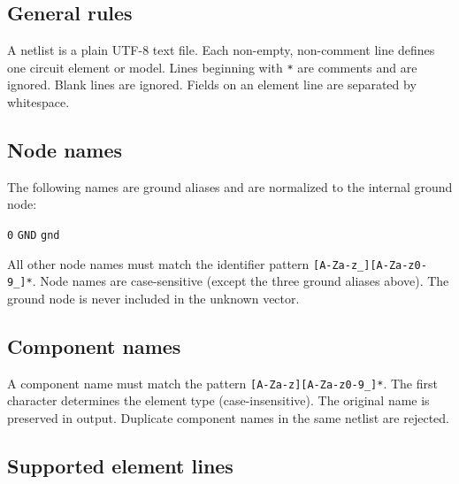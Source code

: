 \documentclass[11pt,a4paper]{article}
\newcommand{\code}[1]{\texttt{#1}}
\begin{document}
\subsection{General rules}

A netlist is a plain UTF-8 text file.
Each non-empty, non-comment line defines one circuit element or model.
Lines beginning with \code{*} are comments and are ignored.
Blank lines are ignored.
Fields on an element line are separated by whitespace.

\subsection{Node names}

The following names are ground aliases and are normalized to the
internal ground node:

\begin{center}
\code{0} \quad \code{GND} \quad \code{gnd}
\end{center}

All other node names must match the identifier pattern
\verb|[A-Za-z_][A-Za-z0-9_]*|.
Node names are case-sensitive (except the three ground aliases above).
The ground node is never included in the unknown vector.

\subsection{Component names}

A component name must match the pattern \verb|[A-Za-z][A-Za-z0-9_]*|.
The first character determines the element type (case-insensitive).
The original name is preserved in output.
Duplicate component names in the same netlist are rejected.

\subsection{Supported element lines}
\end{document}
